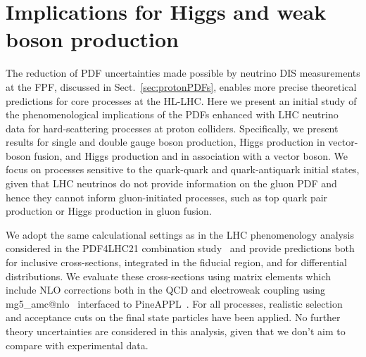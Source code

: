 \section{Implications for Higgs and weak boson production}
\label{sec:pheno}

The reduction of PDF uncertainties made possible by neutrino DIS measurements
at the FPF, discussed in Sect.~\ref{sec:protonPDFs},
enables more precise theoretical predictions for core processes at the
HL-LHC.
%
Here we present an initial study of the phenomenological implications
of the PDFs enhanced with LHC neutrino data
for hard-scattering processes at proton colliders.
%
Specifically, we present results for 
single and double gauge boson production,  Higgs production in
vector-boson fusion, and Higgs production and in association with a vector boson.
%
We focus on processes sensitive to the quark-quark and quark-antiquark initial
states, given that LHC neutrinos do not provide information on the gluon
PDF and hence they cannot inform  gluon-initiated
processes, such as top quark pair production or Higgs production in gluon fusion.

We adopt the same calculational settings as in the LHC phenomenology analysis considered
in the PDF4LHC21 combination study~\cite{PDF4LHCWorkingGroup:2022cjn} and provide predictions
both for inclusive cross-sections, integrated in the fiducial
region, and for differential distributions.
%
We evaluate these cross-sections using matrix elements
which include NLO corrections both in the
QCD and electroweak coupling using
{\sc\small mg5\_amc@nlo}~\cite{Frederix:2018nkq}
interfaced to {\sc\small PineAPPL}~\cite{Carrazza:2020gss}.
%
For all processes, realistic selection and acceptance cuts on the final state particles
have been applied.
%
No further theory uncertainties are considered in this
analysis, given that we don't aim to compare with experimental data.

